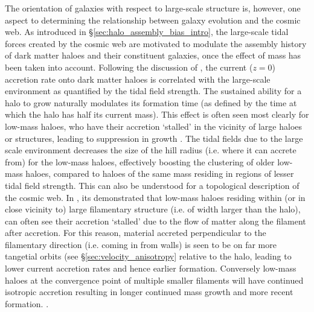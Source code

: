 The orientation of galaxies with respect to large-scale structure is, however, one aspect to determining the relationship between galaxy evolution and the cosmic web. As introduced in \S\ref{sec:halo_assembly_bias_intro}, the large-scale tidal forces created by the cosmic web are motivated to modulate the assembly history of dark matter haloes and their constituent galaxies, once the effect of mass has been taken into account. Following the discussion of \citet{hahn2009}, the current ($z=0$) accretion rate onto dark matter haloes is correlated with the large-scale environment as quantified by the tidal field strength. The sustained ability for a halo to grow naturally modulates its formation time (as defined by the time at which the halo has half its current mass). This effect is often seen most clearly for low-mass haloes, who have their accretion `stalled' in the vicinity of large haloes or structures, leading to suppression in growth \citep[see also;][]{wang2007,dalal2008,lacerna2011}. The tidal fields due to the large scale environment decreases the size of the hill radius (i.e. where it can accrete from) for the low-mass haloes, effectively boosting the clustering of older low-mass haloes, compared to haloes of the same mass residing in regions of lesser tidal field strength. This can also be understood for a topological description of the cosmic web. In \citet{ZOMGI}, its demonstrated that low-mass haloes residing within (or in close vicinity to) large filamentary  structure (i.e. of width larger than the halo), can often see their accretion `stalled' due to the flow of matter along the filament after accretion. For this reason, material accreted perpendicular to the filamentary direction (i.e. coming in from walls) is seen to be on far more tangetial orbits (see \S\ref{sec:velocity_anisotropy} relative to the halo, leading to lower current accretion rates and hence earlier formation. Conversely low-mass haloes at the convergence point of multiple smaller filaments will have continued isotropic accretion resulting in longer continued mass growth and more recent formation. \citep[See][for a theoretical approach]{musso2018}.

